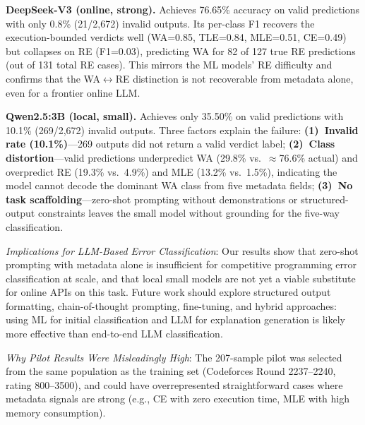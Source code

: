 \documentclass[acmsmall]{acmart}
\begin{document}
\textbf{DeepSeek-V3 (online, strong).} Achieves 76.65\% accuracy on valid
predictions with only 0.8\% (21/2,672) invalid outputs. Its per-class F1
recovers the execution-bounded verdicts well (WA=0.85, TLE=0.84, MLE=0.51,
CE=0.49) but collapses on RE (F1=0.03), predicting WA for 82 of 127 true RE
predictions (out of 131 total RE cases). This mirrors the ML models' RE
difficulty and confirms that the
WA$\leftrightarrow$RE distinction is not recoverable from metadata alone, even
for a frontier online LLM.

\textbf{Qwen2.5:3B (local, small).} Achieves only 35.50\% on valid predictions
with 10.1\% (269/2,672) invalid outputs. Three factors explain the failure:
\textbf{(1)~Invalid rate (10.1\%)}---269 outputs did not return a valid
verdict label; \textbf{(2)~Class distortion}---valid predictions underpredict
WA (29.8\% vs.\ $\approx$76.6\% actual) and overpredict RE (19.3\% vs.\ 4.9\%)
and MLE (13.2\% vs.\ 1.5\%), indicating the model cannot decode the dominant
WA class from five metadata fields; \textbf{(3)~No task scaffolding}---zero-shot
prompting without demonstrations or structured-output constraints leaves the
small model without grounding for the five-way classification.

\textit{Implications for LLM-Based Error Classification}: Our results show that
zero-shot prompting with metadata alone is insufficient for competitive
programming error classification at scale, and that local small models are not
yet a viable substitute for online APIs on this task. Future work should
explore structured output formatting, chain-of-thought prompting, fine-tuning,
and hybrid approaches: using ML for initial classification and LLM for
explanation generation is likely more effective than end-to-end LLM
classification.

\textit{Why Pilot Results Were Misleadingly High}: The 207-sample pilot was
selected from the same population as the training set (Codeforces Round
2237--2240, rating 800--3500), and could have overrepresented straightforward
cases where metadata signals are strong (e.g., CE with zero execution time,
MLE with high memory consumption).

\begin{table}[htbp]
\centering
\caption{LLM prediction analysis on full test set (n=2,672)}
\label{tab:llm-analysis}
%
\end{table}
\end{document}
